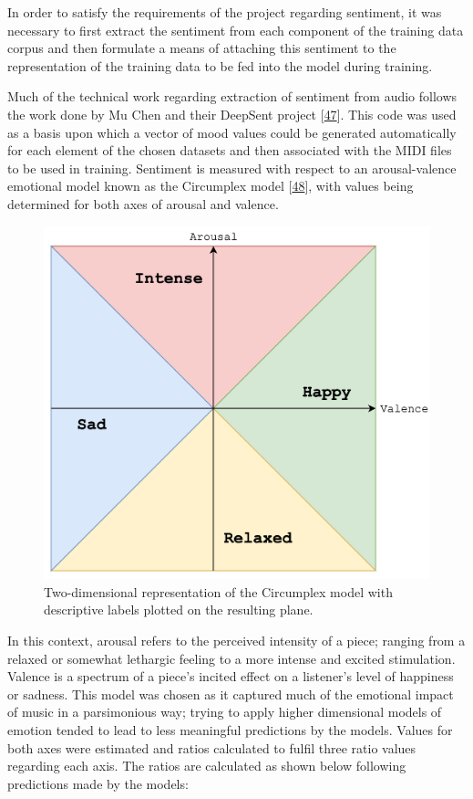 \documentclass[12pt,]{article}
\begin{document}
In order to satisfy the requirements of the project regarding sentiment,
it was necessary to first extract the sentiment from each component of
the training data corpus and then formulate a means of attaching this
sentiment to the representation of the training data to be fed into the
model during training.

Much of the technical work regarding extraction of sentiment from audio
follows the work done by Mu Chen and their DeepSent project
{[}\protect\hyperlink{ref-deepsent}{47}{]}. This code was used as a
basis upon which a vector of mood values could be generated
automatically for each element of the chosen datasets and then
associated with the MIDI files to be used in training. Sentiment is
measured with respect to an arousal-valence emotional model known as the
Circumplex model
{[}\protect\hyperlink{ref-russell1980circumplex}{48}{]}, with values
being determined for both axes of arousal and valence.

\begin{figure}
\centering
\includegraphics{Images/circumplex.png}
\caption{Two-dimensional representation of the Circumplex model with
descriptive labels plotted on the resulting plane.}
\end{figure}

In this context, arousal refers to the perceived intensity of a piece;
ranging from a relaxed or somewhat lethargic feeling to a more intense
and excited stimulation. Valence is a spectrum of a piece's incited
effect on a listener's level of happiness or sadness. This model was
chosen as it captured much of the emotional impact of music in a
parsimonious way; trying to apply higher dimensional models of emotion
tended to lead to less meaningful predictions by the models. Values for
both axes were estimated and ratios calculated to fulfil three ratio
values regarding each axis. The ratios are calculated as shown below
following predictions made by the models:
\end{document}
